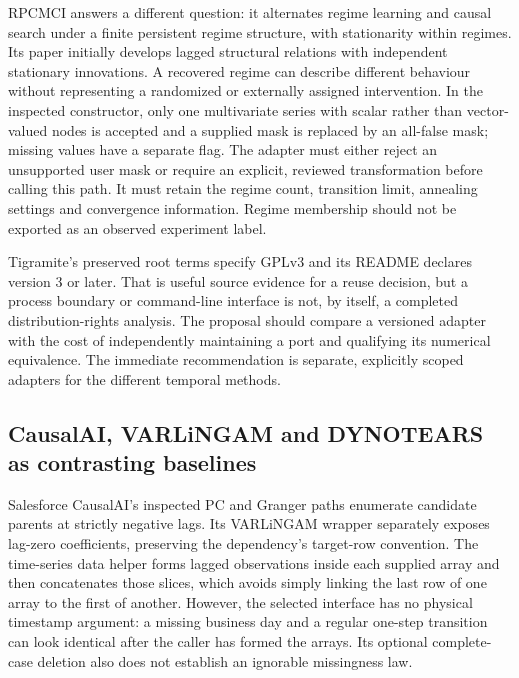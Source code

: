 RPCMCI answers a different question: it alternates regime learning and
causal search under a finite persistent regime structure, with stationarity
within regimes. Its paper initially develops lagged structural relations
with independent stationary innovations. A recovered regime can describe
different behaviour without representing a randomized or externally assigned
intervention. In the inspected constructor, only one multivariate series with scalar rather than vector-valued nodes
is accepted and a supplied mask is replaced by an all-false mask;
missing values have a separate flag. The adapter must either reject an
unsupported user mask or require an explicit, reviewed transformation before
calling this path. It must retain the regime count, transition limit,
annealing settings and convergence information. Regime membership should
not be exported as an observed experiment label.
\citep{exec14_pt_paper_rpcmci,exec14_pt_tigramite}

Tigramite's preserved root terms specify GPLv3 and its README declares
version 3 or later. That is useful source evidence for a reuse decision,
but a process boundary or command-line interface is not, by itself, a
completed distribution-rights analysis. The proposal should compare a
versioned adapter with the cost of independently maintaining a port and
qualifying its numerical equivalence. The immediate recommendation is
separate, explicitly scoped adapters for the different temporal methods.
\citep{exec14_pt_tigramite,exec14_pt_contract}

\subsection{CausalAI, VARLiNGAM and DYNOTEARS as contrasting baselines}

Salesforce CausalAI's inspected PC and Granger paths enumerate candidate
parents at strictly negative lags. Its VARLiNGAM wrapper separately exposes
lag-zero coefficients, preserving the dependency's target-row convention.
The time-series data helper forms lagged observations inside each supplied
array and then concatenates those slices, which avoids simply linking the
last row of one array to the first of another. However, the selected
interface has no physical timestamp argument: a missing business day and
a regular one-step transition can look identical after the caller has
formed the arrays. Its optional complete-case deletion also does not
establish an ignorable missingness law. \citep{exec14_pt_causalai}

